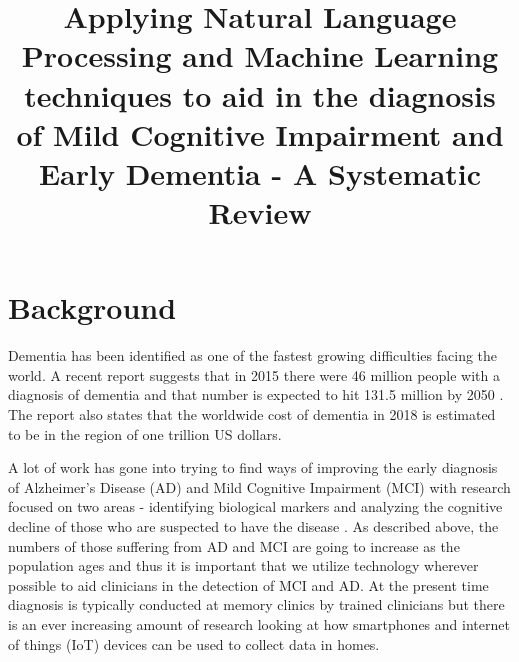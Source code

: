 \documentclass[12pt]{article}
\title{Applying Natural Language Processing and Machine Learning techniques to aid in the diagnosis of Mild Cognitive Impairment and Early Dementia - A Systematic Review}
\begin{document}
\tableofcontents
\section{Background}
Dementia has been identified as one of the fastest growing difficulties facing the world. A recent report suggests that in 2015 there were 46 million people with a diagnosis of dementia and that number is expected to hit 131.5 million by 2050 \cite{Prince2015}. The report also states that the worldwide cost of dementia in 2018 is estimated to be in the region of one trillion US dollars.
\par
A lot of work has gone into trying to find ways of improving the early diagnosis of Alzheimer's Disease (AD) and Mild Cognitive Impairment (MCI) with research focused on two areas - identifying biological markers and analyzing the cognitive decline of those who are suspected to have the disease \cite{Taler2008}. As described above, the numbers of those suffering from AD and MCI are going to increase as the population ages \cite{Prince2015} and thus it is important that we utilize technology wherever possible to aid clinicians in the detection of MCI and AD. At the present time diagnosis is typically conducted at memory clinics by trained clinicians \cite{Boschi2017} but there is an ever increasing amount of research looking at how smartphones and internet of things (IoT) devices can be used to collect data in homes. 
\end{document}
